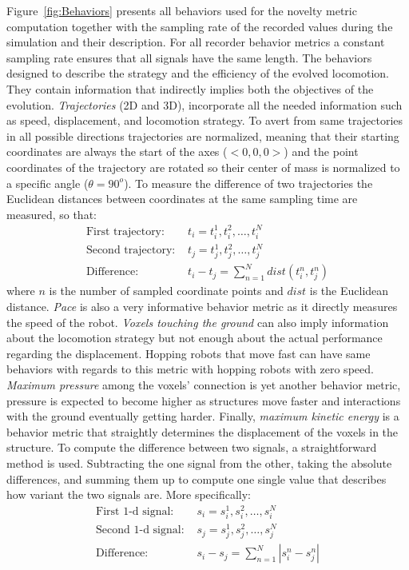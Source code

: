 \documentclass{sig-alternate}
\begin{document}
Figure~\ref{fig:Behaviors} presents all behaviors used for the novelty metric computation together with the sampling rate of the recorded values during the simulation and their description. For all recorder behavior metrics a constant sampling rate ensures that all signals have the same length. The behaviors designed to describe the strategy and the efficiency of the evolved  locomotion. They contain information that indirectly implies both the objectives of the evolution. \emph{Trajectories} (2D and 3D), incorporate all the needed information such as speed, displacement, and locomotion strategy. To avert from same trajectories in all possible directions trajectories are normalized, meaning that their starting coordinates are always the start of the axes ($<0,0,0>$) and the point coordinates of the trajectory are rotated so their center of mass is normalized to a specific angle ($\theta = 90^{o}$). To measure the difference of two trajectories the Euclidean distances between coordinates at the same sampling time are measured, so that:
\begin{align}
\text{First trajectory: } &t_i = t_i^1, t_i^2, \ldots, t_i^N\\
\text{Second trajectory: } &t_j = t_j^1, t_j^2, \ldots, t_j^N\\
\text{Difference: } &t_i - t_j = \sum_{n=1}^{N} dist( t_i^n, t_j^n )
\end{align}
where $n$ is the number of sampled coordinate points and $dist$ is the Euclidean distance. \emph{Pace} is also a very informative behavior metric as it directly measures the speed of the robot. \emph{Voxels touching the ground} can also imply information about the locomotion strategy but not enough about the actual performance regarding the displacement. Hopping robots that move fast can have same behaviors with regards to this metric with hopping robots with zero speed. \emph{Maximum pressure} among the voxels' connection is yet another behavior metric, pressure is expected to become higher as structures move faster and interactions with the ground eventually getting harder. Finally, \emph{maximum kinetic energy} is a behavior metric that straightly determines the displacement of the voxels in the structure. To compute the difference between two signals, a straightforward method is used. Subtracting the one signal from the other, taking the absolute differences, and summing them up to compute one single value that describes how variant the two signals are. More specifically:
\begin{align}
\text{First 1-d signal: } &s_i = s_i^1, s_i^2, \ldots, s_i^N\\
\text{Second 1-d signal: } &s_j = s_j^1, s_j^2, \ldots, s_j^N\\
\text{Difference: } &s_i - s_j = \sum_{n=1}^{N} | s_i^n - s_j^n |
\end{align}
\end{document}
